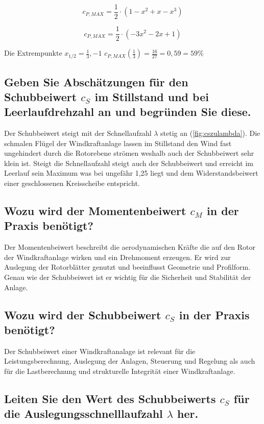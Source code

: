 \begin{equation}
c_{P,MAX}= \frac{1}{2} \cdot (1-x^2+x-x^3)
\label{eq:CPMAX}
\end{equation}

\begin{equation}
c_{P,MAX}=\frac{1}{2} \cdot (-3x^2-2x+1)
\label{eq:CPMAX2}
\end{equation}
 
Die Extrempunkte  $x_{1/2}= \frac{1}{3}, -1$
$c_{P,MAX}(\frac{1}{3})= \frac{16}{27} = 0,59 = 59\%$

\subsection{Geben Sie Abschätzungen für den Schubbeiwert \texorpdfstring{$c_S$}{} im Stillstand und bei
Leerlaufdrehzahl an und begründen Sie diese.}

Der Schubbeiwert steigt mit der Schnellaufzahl $\lambda$ stetig an (\ref{fig:cszulambda}). Die schmalen Flügel der Windkraftanlage lassen im Stillstand den Wind fast ungehindert durch die Rotorebene strömen weshalb auch der Schubbeiwert sehr klein ist. Steigt die Schnellaufzahl steigt auch der Schubbeiwert und erreicht im Leerlauf sein Maximum was bei ungefähr 1,25 liegt und dem Widerstandsbeiwert einer geschlossenen Kreisscheibe entspricht. 


\subsection{Wozu wird der Momentenbeiwert \texorpdfstring{$c_M$}{} in der Praxis benötigt?}

Der Momentenbeiwert beschreibt die aerodynamischen Kräfte die auf den Rotor der Windkraftanlage wirken und ein Drehmoment erzeugen. Er wird zur Auslegung der Rotorblätter genutzt und beeinflusst Geometrie und Profilform. Genau wie der Schubbeiwert ist er wichtig für die Sicherheit und Stabilität der Anlage. 


\subsection{Wozu wird der Schubbeiwert \texorpdfstring{$c_S$}{} in der Praxis benötigt?}

Der Schubbeiwert einer Windkraftanalage ist relevant für die Leistungsberechnung, Auslegung der Anlagen, Steuerung und Regelung als auch für die Lastberechnung und strukturelle Integrität einer Windkraftanlage. 

\subsection{Leiten Sie den Wert des Schubbeiwerts \texorpdfstring{$c_S$}{} für die Auslegungsschnelllaufzahl \texorpdfstring{$\lambda$}{}
her.}

